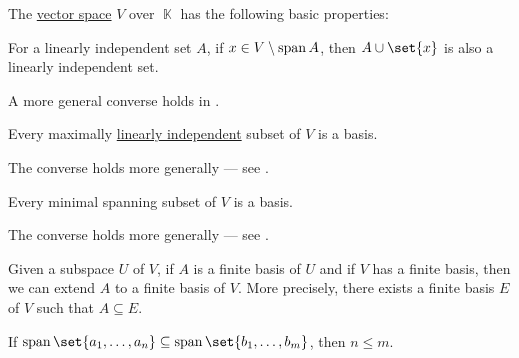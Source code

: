 \begin{proposition}\label{thm:def:vector_space}
  The \hyperref[def:vector_space]{vector space} \( V \) over \( \BbbK \) has the following basic properties:
  \begin{thmenum}
     For a linearly independent set \( A \), if \( x \in V \setminus \operatorname{span} A \), then \( A \cup \set{ x } \) is also a linearly independent set.

    A more general converse holds in .

     Every maximally \hyperref[thm:def:linear_dependence]{linearly independent} subset of \( V \) is a basis.

    The converse holds more generally --- see .

     Every minimal spanning subset of \( V \) is a basis.

    The converse holds more generally --- see .

     Given a subspace \( U \) of \( V \), if \( A \) is a finite basis of \( U \) and if \( V \) has a finite basis, then we can extend \( A \) to a finite basis of \( V \). More precisely, there exists a finite basis \( E \) of \( V \) such that \( A \subseteq E \).

     If \( \linspan\set{ a_1, \ldots, a_n } \subseteq \linspan\set{ b_1, \ldots, b_m } \), then \( n \leq m \).
  \end{thmenum}
\end{proposition}
